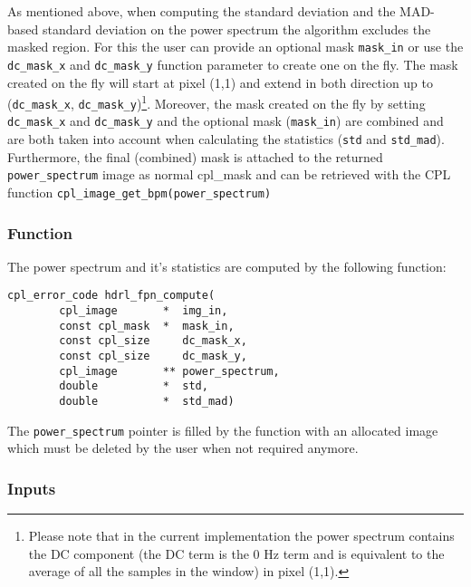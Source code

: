 As mentioned above, when computing the standard deviation and the
MAD-based standard deviation on the power spectrum the algorithm
excludes the masked region. For this the user can provide an optional
mask \verb+mask_in+ or use the \verb+dc_mask_x+ and \verb+dc_mask_y+
function parameter to create one on the fly. The mask created on the
fly will start at pixel (1,1) and extend in both direction up to
(\verb+dc_mask_x+, \verb+dc_mask_y+)\footnote{Please note that in the
  current implementation the power spectrum contains the DC component
  (the DC term is the 0 Hz term and is equivalent to the average of
  all the samples in the window) in pixel (1,1).}. Moreover, the mask
created on the fly by setting \verb+dc_mask_x+ and \verb+dc_mask_y+
and the optional mask (\verb+mask_in+) are combined and are both taken
into account when calculating the statistics (\verb+std+ and
\verb+std_mad+). Furthermore, the final (combined) mask is attached to
the returned \verb+power_spectrum+ image as normal cpl\_mask and can
be retrieved with the CPL function \verb+cpl_image_get_bpm(power_spectrum)+

\newpage

\subsubsection{Function}

The power spectrum and it's statistics are computed by the following
function:
\begin{lstlisting}
cpl_error_code hdrl_fpn_compute(
        cpl_image       *  img_in,
        const cpl_mask  *  mask_in,
        const cpl_size     dc_mask_x,
        const cpl_size     dc_mask_y,
        cpl_image       ** power_spectrum,
        double          *  std,
        double          *  std_mad)
\end{lstlisting}

The \verb+power_spectrum+ pointer is filled by the function with an
allocated image which must be deleted by the user when not required
anymore.

%


\subsubsection{Inputs}
\label{sec:algorithms:fpn:inputs}

